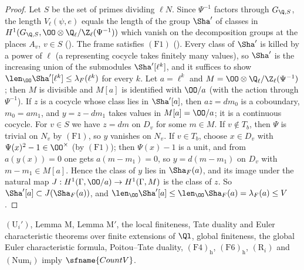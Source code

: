 \begin{proof}
Let $S$ be the set of primes dividing $\ell N$. Since $\Psi^{-1}$ factors through $G_{\Q,S}$, the length $V_\ell(\psi,e)$ equals the length of
the group $\Sha'$ of classes in $H^1(G_{\Q,S},\OO\otimes\eisQZ(\Psi^{-1}))$ which vanish on the decomposition groups at the places $A_v$,
$v\in S$ (). The frame satisfies $(\mathrm{F1})$ ().
Every class of $\Sha'$ is killed by a power of $\ell$ (a representing cocycle takes finitely many values), so $\Sha'$ is the increasing
union of the submodules $\Sha'[\ell^k]$, and it suffices to show $\len_\OO\Sha'[\ell^k]\le\lambda_F(\ell^k)$ for every $k$. Let
$a=\ell^k$ and $M=\OO\otimes\eisQZ(\Psi^{-1})$; then $M$ is divisible and $M[a]$ is identified with $\OO/a$ (with the action through $\Psi^{-1}$).
If $z$ is a cocycle whose class lies in $\Sha'[a]$, then $az=dm_0$ is a coboundary, $m_0=am_1$, and $y=z-dm_1$ takes values in $M[a]=\OO/a$; it
is a continuous cocycle. For $v\in S$ we have $z=dm$ on $D_v$ for some $m\in M$. If $v\notin T_b$, then $\Psi$ is trivial on $N_v$ by $(\mathrm{F1})$,
so $y$ vanishes on $N_v$. If $v\in T_b$, choose $x\in D_v$ with $\Psi(x)^2-1\in\OO^\times$ (by $(\mathrm{F1})$); then $\Psi(x)-1$ is a unit, and from
$a(y(x))=0$ one gets $a(m-m_1)=0$, so $y=d(m-m_1)$ on $D_v$ with $m-m_1\in M[a]$. Hence the class of $y$ lies in $\Sha_F(a)$, and its image
under the natural map $J:H^1(\Gamma,\OO/a)\to H^1(\Gamma,M)$ is the class of $z$. So $\Sha'[a]\subset J(\Sha_F(a))$, and
$\len_\OO\Sha'[a]\le\len_\OO\Sha_F(a)=\lambda_F(a)\le V$.
\end{proof}

\begin{theorem}\label{pf:eis:countVof}
$(\mathrm{U}_i')$, Lemma M, Lemma M$'$, the local finiteness, Tate duality and Euler characteristic theorems over finite extensions of
$\Ql$, global finiteness, the global Euler characteristic formula, Poitou--Tate duality, $(\mathrm{F4})_{\mathrm h}$, $(\mathrm{F6})_{\mathrm h}$,
$(\mathrm{R}_i)$ and $(\mathrm{Num}_i)$ imply $\sfname{CountV}$.
\end{theorem}

